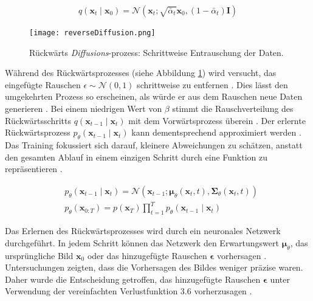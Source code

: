 \documentclass[
  a4paper,  %
  twoside,  %
  bibliography=totoc,
  headsepline,
  cleardoublepage=empty,
  parskip=half,
  draft=false
]{scrbook}
\begin{document}
{\begin{equation}
    q\left(\mathbf{x}_t \mid \mathbf{x}_0\right)=\mathcal{N}\left(\mathbf{x}_t ; \sqrt{\bar{\alpha}_t} \mathbf{x}_0,\left(1-\bar{\alpha}_t\right) \mathbf{I}\right)
\end{equation}

\begin{figure}[h]
  \centering
  \texttt{[image: reverseDiffusion.png]}
  \caption[Rückwertsprozess Diffusion]{Rückwärts \emph{Diffusions}-prozess: Schrittweise Entrauschung der Daten. \cite{machine_learning_at_berkeley_diffusion_2022}}
  \label{fig:reverseDiffusion}
\end{figure} 

Während des Rückwärtsprozesses (siehe Abbildung \ref{fig:reverseDiffusion}) wird versucht, das eingefügte Rauschen $\epsilon \sim \mathcal{N}(0,1)$ schrittweise zu entfernen \cite{machine_learning_at_berkeley_diffusion_2022}. Dies lässt den umgekehrten Prozess so erscheinen, als würde er aus dem Rauschen neue Daten generieren \cite{machine_learning_at_berkeley_diffusion_2022}. Bei einem niedrigen Wert von $\beta$ stimmt die Rauschverteilung des Rückwärtsschritts \( q\left(\mathbf{x}_{t-1} \mid \mathbf{x}_t\right) \) mit dem Vorwärtsprozess überein \cite{sohl-dickstein_deep_2015}. Der erlernte Rückwärtsprozess \( p_\theta\left(\mathbf{x}_{t-1} \mid \mathbf{x}_t\right) \) kann dementsprechend approximiert werden \cite{ho_denoising_2020, machine_learning_at_berkeley_diffusion_2022, nichol_improved_2021}. Das Training fokussiert sich darauf, kleinere Abweichungen zu schätzen, anstatt den gesamten Ablauf in einem einzigen Schritt durch eine Funktion zu repräsentieren \cite{sohl-dickstein_deep_2015}.


\begin{align}
& p_\theta\left(\mathbf{x}_{t-1} \mid \mathbf{x}_t\right)=\mathcal{N}\left(\mathbf{x}_{t-1} ; \boldsymbol{\mu}_\theta\left(\mathbf{x}_t, t\right), \boldsymbol{\Sigma}_\theta\left(\mathbf{x}_t, t\right)\right)\\
& p_\theta\left(\mathbf{x}_{0: T}\right)=p\left(\mathbf{x}_T\right) \prod_{t=1}^T p_\theta\left(\mathbf{x}_{t-1} \mid \mathbf{x}_t\right)
\end{align}

Das Erlernen des Rückwärtsprozesses wird durch ein neuronales Netzwerk durchgeführt. In jedem Schritt können das Netzwerk den Erwartungswert $\boldsymbol{\mu}_\theta$, das ursprüngliche Bild $\boldsymbol{x}_0$ oder das hinzugefügte Rauschen $\boldsymbol{\epsilon}$ vorhersagen \cite{ho_denoising_2020, nichol_improved_2021}. Untersuchungen zeigten, dass die Vorhersagen des Bildes weniger präzise waren. Daher wurde die Entscheidung getroffen, das hinzugefügte Rauschen $\boldsymbol{\epsilon}$ unter Verwendung der vereinfachten Verlustfunktion 3.6 vorherzusagen \cite{ho_denoising_2020}.

}
\end{document}
